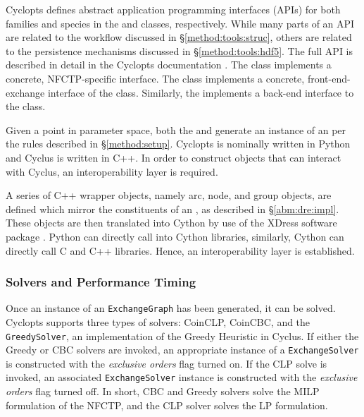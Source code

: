 Cyclopts defines abstract application programming interfaces (APIs) for both
families and species in the  and 
classes, respectively. While many parts of an API are related to the workflow
discussed in \S \ref{method:tools:struc}, others are related to the persistence
mechanisms discussed in \S \ref{method:tools:hdf5}. The full API is described in
detail in the Cyclopts documentation \cite{cyclopts}. The 
class implements a concrete, NFCTP-specific  interface. The
 class implements a concrete, front-end-exchange
interface of the  class. Similarly, the
 implements a back-end interface to the class.

Given a point in parameter space, both the  and
 generate an instance of an  per the
rules described in \S \ref{method:setup}. Cyclopts is nominally written in
Python and Cyclus is written in C++. In order to construct objects that can
interact with Cyclus, an interoperability layer is required. 

A series of C++ wrapper objects, namely arc, node, and group objects, are
defined which mirror the constituents of an , as described
in \S \ref{abm:dre:impl}. These objects are then translated into Cython
\cite{behnel2010cython} by use of the XDress software package
\cite{xdress}. Python can directly call into Cython libraries, similarly, Cython
can directly call C and C++ libraries. Hence, an interoperability layer is
established.

\subsubsection{Solvers and Performance Timing}

Once an instance of an \texttt{ExchangeGraph} has been generated, it can be
solved. Cyclopts supports three types of solvers: CoinCLP, CoinCBC, and the
\texttt{GreedySolver}, an implementation of the Greedy Heuristic in Cyclus. If
either the Greedy or CBC solvers are invoked, an appropriate instance of a
\texttt{ExchangeSolver} is constructed with the \textit{exclusive orders} flag
turned on. If the CLP solve is invoked, an associated \texttt{ExchangeSolver}
instance is constructed with the \textit{exclusive orders} flag turned off. In
short, CBC and Greedy solvers solve the MILP formulation of the NFCTP, and the
CLP solver solves the LP formulation.


